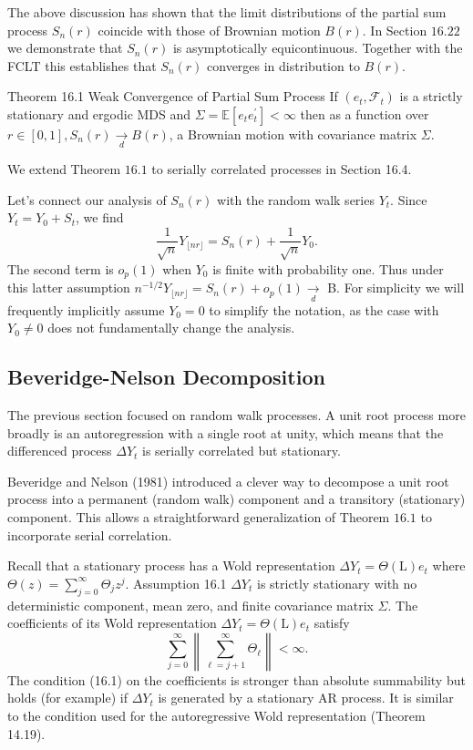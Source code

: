 \documentclass[10pt]{article}
\begin{document}
The above discussion has shown that the limit distributions of the partial sum process $S_{n}(r)$ coincide with those of Brownian motion $B(r)$. In Section $16.22$ we demonstrate that $S_{n}(r)$ is asymptotically equicontinuous. Together with the FCLT this establishes that $S_{n}(r)$ converges in distribution to $B(r)$.

Theorem 16.1 Weak Convergence of Partial Sum Process If $\left(e_{t}, \mathscr{F}_{t}\right)$ is a strictly stationary and ergodic MDS and $\Sigma=\mathbb{E}\left[e_{t} e_{t}^{\prime}\right]<\infty$ then as a function over $r \in[0,1], S_{n}(r) \underset{d}{\longrightarrow} B(r)$, a Brownian motion with covariance matrix $\Sigma$.

We extend Theorem $16.1$ to serially correlated processes in Section 16.4.

Let's connect our analysis of $S_{n}(r)$ with the random walk series $Y_{t}$. Since $Y_{t}=Y_{0}+S_{t}$, we find
$$
\frac{1}{\sqrt{n}} Y_{\lfloor n r\rfloor}=S_{n}(r)+\frac{1}{\sqrt{n}} Y_{0} .
$$
The second term is $o_{p}(1)$ when $Y_{0}$ is finite with probability one. Thus under this latter assumption $n^{-1 / 2} Y_{\lfloor n r\rfloor}=S_{n}(r)+o_{p}(1) \underset{d}{\longrightarrow}$ B. For simplicity we will frequently implicitly assume $Y_{0}=0$ to simplify the notation, as the case with $Y_{0} \neq 0$ does not fundamentally change the analysis.

\subsection{Beveridge-Nelson Decomposition}
The previous section focused on random walk processes. A unit root process more broadly is an autoregression with a single root at unity, which means that the differenced process $\Delta Y_{t}$ is serially correlated but stationary.

Beveridge and Nelson (1981) introduced a clever way to decompose a unit root process into a permanent (random walk) component and a transitory (stationary) component. This allows a straightforward generalization of Theorem $16.1$ to incorporate serial correlation.

Recall that a stationary process has a Wold representation $\Delta Y_{t}=\Theta(\mathrm{L}) e_{t}$ where $\Theta(z)=\sum_{j=0}^{\infty} \Theta_{j} z^{j}$. Assumption 16.1 $\Delta Y_{t}$ is strictly stationary with no deterministic component, mean zero, and finite covariance matrix $\Sigma$. The coefficients of its Wold representation $\Delta Y_{t}=\Theta(\mathrm{L}) e_{t}$ satisfy
$$
\sum_{j=0}^{\infty}\left\|\sum_{\ell=j+1}^{\infty} \Theta_{\ell}\right\|<\infty .
$$
The condition (16.1) on the coefficients is stronger than absolute summability but holds (for example) if $\Delta Y_{t}$ is generated by a stationary AR process. It is similar to the condition used for the autoregressive Wold representation (Theorem 14.19).
\end{document}
